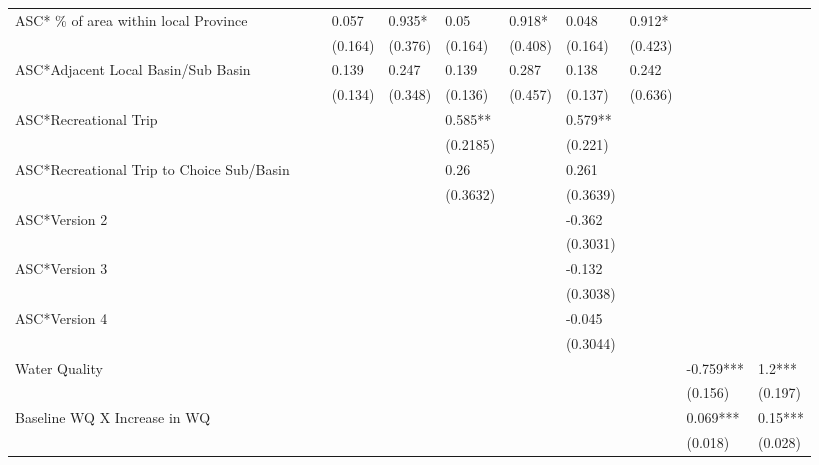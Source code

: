 \begin{landscape}
\begin{table}[ht]
{\begin{tabular}{lllllllllll}
  ASC* \% of area within local Province &  &  & 0.057 & 0.935* & 0.05 & 0.918* & 0.048 & 0.912* &  &  \\ 
   &  &  & (0.164) & (0.376) & (0.164) & (0.408) & (0.164) & (0.423) &  &  \\ 
  ASC*Adjacent Local Basin/Sub Basin &  &  & 0.139 & 0.247 & 0.139 & 0.287 & 0.138 & 0.242 &  &  \\ 
   &  &  & (0.134) & (0.348) & (0.136) & (0.457) & (0.137) & (0.636) &  &  \\ 
  ASC*Recreational Trip &  &  &  &  & 0.585** &  & 0.579** &  &  &  \\ 
   &  &  &  &  & (0.2185) &  & (0.221) &  &  &  \\ 
  ASC*Recreational Trip to Choice Sub/Basin &  &  &  &  & 0.26 &  & 0.261 &  &  &  \\ 
   &  &  &  &  & (0.3632) &  & (0.3639) &  &  &  \\ 
  ASC*Version 2 &  &  &  &  &  &  & -0.362 &  &  &  \\ 
   &  &  &  &  &  &  & (0.3031) &  &  &  \\ 
  ASC*Version 3 &  &  &  &  &  &  & -0.132 &  &  &  \\ 
   &  &  &  &  &  &  & (0.3038) &  &  &  \\ 
  ASC*Version 4 &  &  &  &  &  &  & -0.045 &  &  &  \\ 
   &  &  &  &  &  &  & (0.3044) &  &  &  \\ 
  Water Quality &  &  &  &  &  &  &  &  & -0.759*** & 1.2*** \\ 
   &  &  &  &  &  &  &  &  & (0.156) & (0.197) \\ 
  Baseline WQ X Increase in WQ &  &  &  &  &  &  &  &  & 0.069*** & 0.15*** \\ 
   &  &  &  &  &  &  &  &  & (0.018) & (0.028) \\ 
   \hline
\end{tabular}
}
\end{table}
\end{landscape}
